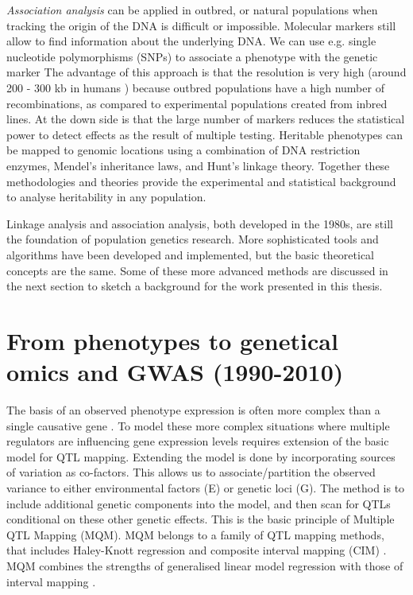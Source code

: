 \emph{Association analysis} can be applied in outbred, or natural populations when tracking the origin of the DNA is difficult 
or impossible. Molecular markers still allow to find information about the underlying DNA. We can use e.g. single nucleotide 
polymorphisms (SNPs) to associate a phenotype with the genetic marker \cite{Mehta:2013} The advantage of this approach is that 
the resolution is very high (around 200 - 300 kb in humans \cite{HapMap:2005}) because outbred populations have a high number of 
recombinations, as compared to experimental populations created from inbred lines. At the down side is that the large number of markers reduces the statistical 
power to detect effects as the result of multiple testing. Heritable phenotypes can be mapped to genomic locations using a 
combination of DNA restriction enzymes, Mendel's inheritance laws, and Hunt's linkage theory. Together these methodologies and 
theories provide the experimental and statistical background to analyse heritability in any population.

Linkage analysis and association analysis, both developed in the 1980s, are still the foundation of population genetics research. 
More sophisticated tools and algorithms have been developed and implemented, but the basic theoretical concepts are the same. 
Some of these more advanced methods are discussed in the next section to sketch a background for the work presented in this 
thesis. 

\section{From phenotypes to genetical omics and GWAS (1990-2010)}

The basis of an observed phenotype expression is often more complex than a single causative gene \cite{Sinha:2006, 
West:2007}. To model these more complex situations where multiple regulators are influencing gene expression levels requires extension of 
the basic model for QTL mapping. Extending the model is done by incorporating sources of variation as co-factors. This 
allows us to associate/partition the observed variance to either environmental factors (E) or genetic loci (G). The method 
is to include additional genetic components into the model, and then scan for QTLs conditional on these other genetic effects. 
This is the basic principle of Multiple QTL Mapping (MQM). MQM belongs to a family of QTL mapping methods, that includes 
Haley-Knott regression \cite{Haley:1992} and composite interval mapping (CIM) \cite{Zeng:1994}. MQM combines the strengths 
of generalised linear model regression with those of interval mapping \cite{Jansen:1993, Jansen:1994b}.

